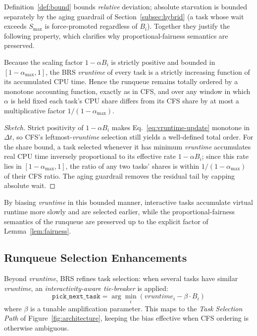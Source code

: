 Definition~\ref{def:bound} bounds \emph{relative} deviation; absolute starvation is bounded separately by the aging guardrail of Section~\ref{subsec:hybrid} (a task whose wait exceeds $S_{\max}$ is force-promoted regardless of $B_i$). Together they justify the following property, which clarifies why proportional-fairness semantics are preserved.

\begin{lemma}
\label{lem:fairness}
Because the scaling factor $1-\alpha B_i$ is strictly positive and bounded in $[1-\alpha_{\max},1]$, the BRS \textit{vruntime} of every task is a strictly increasing function of its accumulated CPU time. Hence the runqueue remains totally ordered by a monotone accounting function, exactly as in CFS, and over any window in which $\alpha$ is held fixed each task's CPU share differs from its CFS share by at most a multiplicative factor $1/(1-\alpha_{\max})$.
\end{lemma}

\begin{proof}[Sketch]
Strict positivity of $1-\alpha B_i$ makes Eq.~\eqref{eq:vruntime-update} monotone in $\Delta t$, so CFS's leftmost-\textit{vruntime} selection still yields a well-defined total order. For the share bound, a task selected whenever it has minimum \textit{vruntime} accumulates real CPU time inversely proportional to its effective rate $1-\alpha B_i$; since this rate lies in $[1-\alpha_{\max},1]$, the ratio of any two tasks' shares is within $1/(1-\alpha_{\max})$ of their CFS ratio. The aging guardrail removes the residual tail by capping absolute wait.
\end{proof}

By biasing \textit{vruntime} in this bounded manner, interactive tasks accumulate virtual runtime more slowly and are selected earlier, while the proportional-fairness semantics of the runqueue are preserved up to the explicit factor of Lemma~\ref{lem:fairness}.

\subsection{Runqueue Selection Enhancements}
Beyond \textit{vruntime}, BRS refines task selection: when several tasks have similar \textit{vruntime}, an \emph{interactivity-aware tie-breaker} is applied:
\[
\texttt{pick\_next\_task} =
\arg\min_{i} (\textit{vruntime}_i - \beta \cdot B_i)
\]
where $\beta$ is a tunable amplification parameter. This maps to the \emph{Task Selection Path} of Figure~\ref{fig:architecture}, keeping the bias effective when CFS ordering is otherwise ambiguous.

